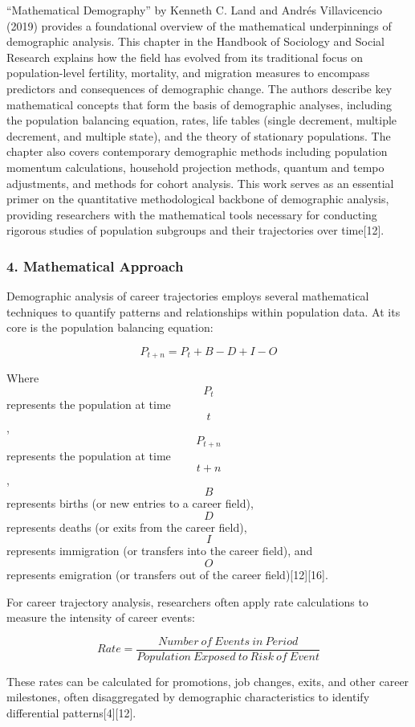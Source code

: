 \documentclass[./main.tex]{subfiles}
\begin{document}
``Mathematical Demography'' by Kenneth C. Land and Andrés Villavicencio
(2019) provides a foundational overview of the mathematical
underpinnings of demographic analysis. This chapter in the Handbook of
Sociology and Social Research explains how the field has evolved from
its traditional focus on population-level fertility, mortality, and
migration measures to encompass predictors and consequences of
demographic change. The authors describe key mathematical concepts that
form the basis of demographic analyses, including the population
balancing equation, rates, life tables (single decrement, multiple
decrement, and multiple state), and the theory of stationary
populations. The chapter also covers contemporary demographic methods
including population momentum calculations, household projection
methods, quantum and tempo adjustments, and methods for cohort analysis.
This work serves as an essential primer on the quantitative
methodological backbone of demographic analysis, providing researchers
with the mathematical tools necessary for conducting rigorous studies of
population subgroups and their trajectories over time{[}12{]}.

\subsubsection{4. Mathematical Approach}\label{mathematical-approach}

Demographic analysis of career trajectories employs several mathematical
techniques to quantify patterns and relationships within population
data. At its core is the population balancing equation:

\[ P_{t+n} = P_t + B - D + I - O \]

Where \[P_t\] represents the population at time \[t\], \[P_{t+n}\]
represents the population at time \[t+n\], \[B\] represents births (or
new entries to a career field), \[D\] represents deaths (or exits from
the career field), \[I\] represents immigration (or transfers into the
career field), and \[O\] represents emigration (or transfers out of the
career field){[}12{]}{[}16{]}.

For career trajectory analysis, researchers often apply rate
calculations to measure the intensity of career events:

\[ Rate = \frac{Number\:of\:Events\:in\:Period}{Population\:Exposed\:to\:Risk\:of\:Event} \]

These rates can be calculated for promotions, job changes, exits, and
other career milestones, often disaggregated by demographic
characteristics to identify differential patterns{[}4{]}{[}12{]}.
\end{document}
